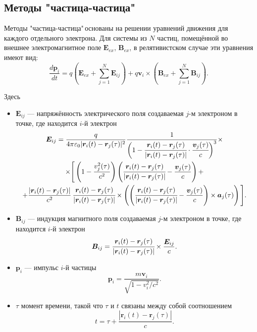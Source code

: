 \documentclass[a4paper,14pt]{extreport} %
\newcommand{\Dff}[2]{\frac{d #1}{d #2}}
\renewcommand{\vec}[1]{\bm{#1}}
\newcommand{\eps}{\varepsilon}
\begin{document}
\subsection{Методы "частица-частица"\,}

Методы "частица-частица"\,основаны на решении уравнений движения для каждого отдельного электрона. Для системы из $N$ частиц, помещённой во внешнее электромагнитное поле $\vec{E}_{ex}$, $\vec{B}_{ex}$, в релятивистском случае эти уравнения имеют вид:
\begin{equation}\label{eq: obs}
\Dff{\vec{p}_i}{t} = 
q\left(
\vec{E}_{ex}+ \sum_{j=1}^{N}\vec{E}_{ij} 
\right) + 
q\vec{v}_i\times\left(
\vec{B}_{ex}+ \sum_{j=1}^{N}\vec{B}_{ij} 
\right).
\end{equation}

Здесь
\begin{itemize}
	\item[]	$\vec{E}_{ij}$ --- напряжённость электрического поля создаваемая $j$-м электроном в точке, где находится $i$-й электрон
	\begin{equation}\label{eq: E1}
	\begin{gathered}
	\vec{E}_{ij} = 
	\frac{q}{4\pi\eps_0
		|\vec{r}_i(t) - \vec{r}_j(\tau)|^2}
	\frac{1}{
		\bigg(
		1-\cfrac{
			\vec{r}_i(t) - \vec{r}_j(\tau)}{
			|\vec{r}_i(t) - \vec{r}_j(\tau)|
		}\cdot\cfrac{\vec{v}_j(\tau)}{c}
		\bigg)^3}
	\times
	\\
	\times
	\Bigg[
	\left(1-\frac{v_j^2(\tau)}{c^2}\right)
	\left(
	\cfrac{\vec{r}_i(t) - \vec{r}_j(\tau)}{|\vec{r}_i(t) - \vec{r}_j(\tau)|}
	-\frac{\vec{v}_j(\tau)}{c}\right)
	+ \\ +
	\frac{|\vec{r}_i(t) - \vec{r}_j(\tau)|}{c^2}
	\,
	\cfrac{\vec{r}_i(t) - \vec{r}_j(\tau)}{|\vec{r}_i(t) - \vec{r}_j(\tau)|}		
	\times
	\left(\left(
	\cfrac{\vec{r}_i(t) - \vec{r}_j(\tau)}{|\vec{r}_i(t) - \vec{r}_j(\tau)|}			
	-\frac{\vec{v}_j(\tau)}{c}\right)\times\vec{a}_j(\tau)\right)
	\Bigg].
	\end{gathered}
	\end{equation}
	
	\item[] $\vec{B}_{ij}$ --- индукция магнитного поля создаваемая $j$-м электроном в точке, где находится $i$-й электрон
	\begin{equation}\label{eq: B1}
	\begin{gathered}
	\vec{B}_{ij} = 
	\cfrac{\vec{r}_i(t) - \vec{r}_j(\tau)}{|\vec{r}_i(t) - \vec{r}_j(\tau)|}
	\times\frac{\vec{E}_{ij}}{c}.
	\end{gathered}
	\end{equation}
	
	\item[] $\vec{p}_i$ --- импульс $i$-й частицы
	\[ \vec{p}_i = \frac{m\vec{v}_i}{\sqrt{1-v_i^2/c^2}}.\]
	
	\item[] $\tau$ момент времени, такой что $\tau$ и $t$ связаны между собой соотношением 
	\[t = \tau + \frac{|\vec{r}_i(t) - \vec{r}_j(\tau)|}{c}.\] 
\end{itemize}
\end{document}
